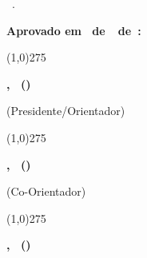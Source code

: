 \begin{folhaaprovacao}
	\setlength{\headheight}{15pt}
	\centering
	{\bfseries\autor}\par
	\vspace{98pt}			%

	\ifbancaCincoExiste
	\vspace{-24pt}
	\else
	\fi

	\singlespacing
	\textsc{\bfseries\tituloTrabalho}\par

	\vspace{98pt}

	\ifbancaCincoExiste
		\vspace{-24pt}
	\else
	\fi

	\begin{adjustwidth}{0.5\textwidth}{}
		\justifying
		\singlespacing
		\textoFolhaRosto\ \textbf{\grauFolhaRosto}.\par
	\end{adjustwidth}

	\vspace{56pt}			%

	\ifbancaCincoExiste
	\vspace{-16pt}
	\else
	\fi

	\centering
	\vspace{48pt}

	\ifbancaCincoExiste
	\vspace{-16pt}
	\else
	\fi

	\textbf{Aprovado em \diaDefesa\ de\ \mesDefesa\ de\ \ano:}\par

	\vspace{56pt}
	\linethickness{1.75pt}
	\line(1,0){275}\par
	\textbf{\orientador , \orientadorTitulo\ (\universidadeSigla)}\par
	(Presidente/Orientador)

	\vspace{14pt}
	\line(1,0){275}\par
	\textbf{\bancaUm , \bancaUmTitulo\ (\bancaUmSigla)}\par
	\ifcoorientador
		{(Co-Orientador)}
	\fi

	\vspace{14pt}
	\line(1,0){275}\par
	\textbf{\bancaDois , \bancaDoisTitulo\ (\bancaDoisSigla)}\par


\end{folhaaprovacao}
